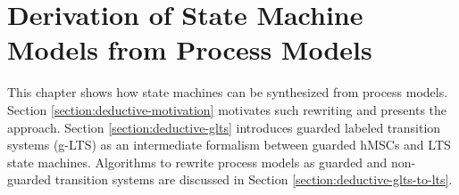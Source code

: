 \chapter{Derivation of State Machine Models from Process Models\label{chapter:deductive}}

This chapter shows how state machines can be synthesized from process models. Section \ref{section:deductive-motivation} motivates such rewriting and presents the approach. Section \ref{section:deductive-glts} introduces guarded labeled transition systems (g-LTS) as an intermediate formalism between guarded hMSCs and LTS state machines. Algorithms to rewrite process models as guarded and non-guarded transition systems are discussed in Section \ref{section:deductive-glts-to-lts}.





